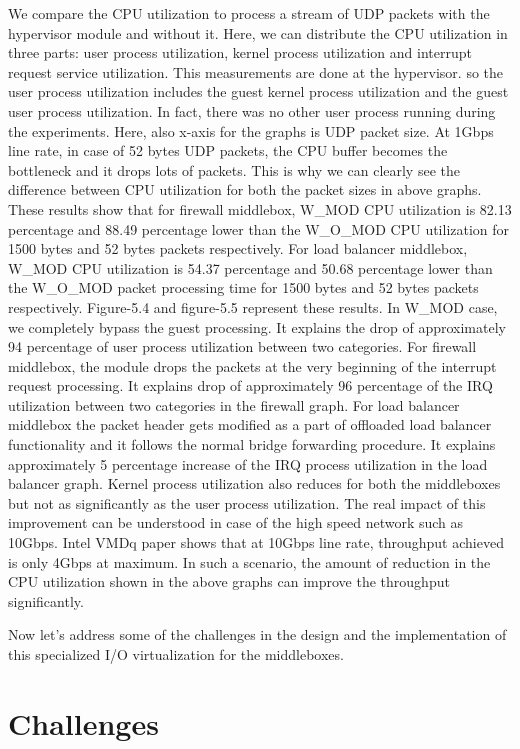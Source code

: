 \documentclass[a4paper,11pt]{report}
\begin{document}
We compare the CPU utilization to process a stream of UDP packets with the hypervisor module and without it. Here, we can distribute the CPU utilization in three parts: user process utilization, kernel process utilization and interrupt request service utilization. This measurements are done at the hypervisor. so the user process utilization includes the guest kernel process utilization and the guest user process utilization. In fact, there was no other user process running during the experiments. Here, also x-axis for the graphs is UDP packet size. At 1Gbps line rate, in case of 52 bytes UDP packets, the CPU buffer becomes the bottleneck and it drops lots of packets. This is why we can clearly see the difference between CPU utilization for both the packet sizes in above graphs. These results show that for firewall middlebox, W\_MOD CPU utilization is 82.13 percentage and 88.49 percentage lower than the W\_O\_MOD CPU utilization for 1500 bytes and 52 bytes packets respectively. For load balancer middlebox, W\_MOD CPU utilization is 54.37 percentage and 50.68 percentage lower than the W\_O\_MOD packet processing time for 1500 bytes and 52 bytes packets respectively. Figure-5.4 and figure-5.5 represent these results. In W\_MOD case, we completely bypass the guest processing. It explains the drop of approximately 94 percentage of user process utilization between two categories. For firewall middlebox, the module drops the packets at the very beginning of the interrupt request processing. It explains drop of approximately 96 percentage of the IRQ utilization between two categories in the firewall graph. For load balancer middlebox the packet header gets modified as a part of offloaded load balancer functionality and it follows the normal bridge forwarding procedure. It explains approximately 5 percentage increase of the IRQ process utilization in the load balancer graph. Kernel process utilization also reduces for both the middleboxes but not as significantly as the user process utilization. The real impact of this improvement can be understood in case of the high speed network such as 10Gbps. Intel VMDq\cite{VMD} paper shows that at 10Gbps line rate, throughput achieved is only 4Gbps at maximum. In such a scenario, the amount of reduction in the CPU utilization shown in the above graphs can improve the throughput significantly.  

Now let's address some of the challenges in the design and the implementation of this specialized I/O virtualization for the middleboxes.          
\section{Challenges}
\end{document}
